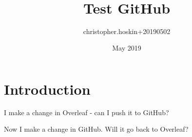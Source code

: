 \documentclass{article}
\title{Test GitHub}
\author{christopher.hoskin+20190502 }
\date{May 2019}
\begin{document}
\maketitle

\section{Introduction}

I make a change in Overleaf - can I push it to GitHub?

Now I make a change in GitHub. Will it go back to Overleaf?
\end{document}
